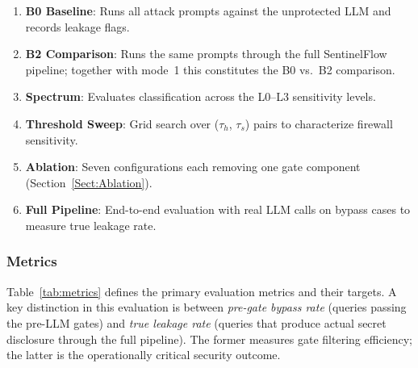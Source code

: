 \documentclass[journal]{IEEEtran}
\begin{document}
\begin{enumerate}
    \item \textbf{B0 Baseline}: Runs all attack prompts against the unprotected LLM and records leakage flags.
    \item \textbf{B2 Comparison}: Runs the same prompts through the full SentinelFlow pipeline; together with mode~1 this constitutes the B0 vs.\ B2 comparison.
    \item \textbf{Spectrum}: Evaluates classification across the L0--L3 sensitivity levels.
    \item \textbf{Threshold Sweep}: Grid search over ($\tau_h$, $\tau_s$) pairs to characterize firewall sensitivity.
    \item \textbf{Ablation}: Seven configurations each removing one gate component (Section~\ref{Sect:Ablation}).
    \item \textbf{Full Pipeline}: End-to-end evaluation with real LLM calls on bypass cases to measure true leakage rate.
\end{enumerate}

\subsubsection{Metrics}

Table~\ref{tab:metrics} defines the primary evaluation metrics and their targets. A key distinction in this evaluation is between \textit{pre-gate bypass rate} (queries passing the pre-LLM gates) and \textit{true leakage rate} (queries that produce actual secret disclosure through the full pipeline). The former measures gate filtering efficiency; the latter is the operationally critical security outcome.

\begin{table}[!ht]
    \centering
    \caption{Evaluation Metrics and Targets}
    \label{tab:metrics}
\end{table}
\end{document}
